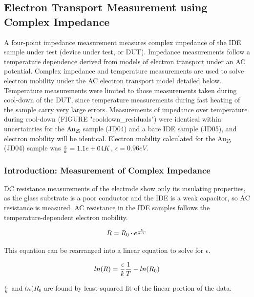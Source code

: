 \documentclass[12pt,oneside,english]{article}
\begin{document}
	\subsection{Electron Transport Measurement using Complex Impedance}
	A four-point impedance measurement measures complex impedance of the IDE sample under test (device under test, or DUT).  
	Impedance measurements follow a temperature dependence derived from models of electron transport under an AC potential.  
	Complex impedance and temperature measurements are used to solve electron mobility under the AC electron transport model detailed below.  
	Temperature measurements were limited to those measurements taken during cool-down of the DUT, since temperature measurements during fast heating of the sample carry very large errors.  
	Measurements of impedance over temperature during cool-down (FIGURE "cooldown\_residuals") were identical within uncertainties for the Au$_25$ sample (JD04) and a bare IDE sample (JD05), and electron mobility will be identical.  
	Electron mobility calculated for the Au$_25$ (JD04) sample was ${\epsilon\over{k}} = 1.1e+04 K$, $\epsilon = 0.96 eV$.
		
	\subsubsection{Introduction: Measurement of Complex Impedance} 
	DC resistance measurements of the electrode show only its insulating properties, as the glass substrate is a poor conductor and the IDE is a weak capacitor, so AC resistance is measured.
	AC resistance in the IDE samples follows the temperature-dependent electron mobility.
	
	\begin{equation}
		R = R_0 \cdot e^{\epsilon\over{k \cdot T}}
		\label{eq:emobility}
	\end{equation}
	
	This equation can be rearranged into a linear equation to solve for $\epsilon$.
	
	\begin{equation}
		ln(R) = {\epsilon\over{k}} {1\over{T}} - ln(R_0)
		\label{eq:solve_emobility}
	\end{equation}
	
	${\epsilon\over{k}}$ and $ln(R_0$ are found by least-squared fit of the linear portion of the data.
	
\end{document}
